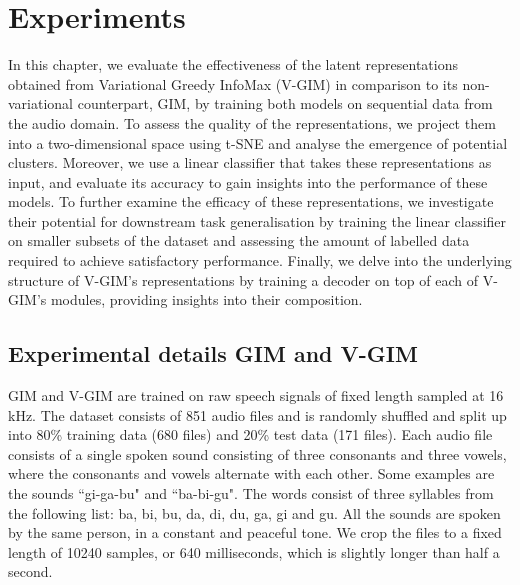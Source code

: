 \chapter{Experiments} \label{cha:4}

In this chapter, we evaluate the effectiveness of the latent representations obtained from Variational Greedy InfoMax (V-GIM) in comparison to its non-variational counterpart, GIM, by training both models on sequential data from the audio domain. To assess the quality of the representations, we project them into a two-dimensional space using t-SNE and analyse the emergence of potential clusters. Moreover, we use a linear classifier that takes these representations as input, and evaluate its accuracy to gain insights into the performance of these models. To further examine the efficacy of these representations, we investigate their potential for downstream task generalisation by training the linear classifier on smaller subsets of the dataset and assessing the amount of labelled data required to achieve satisfactory performance. Finally, we delve into the underlying structure of V-GIM's representations by training a decoder on top of each of V-GIM's modules, providing insights into their composition.


%	

	







\section{Experimental details GIM and V-GIM} \label{cha:experim_details_vgim}
		GIM and V-GIM are trained on raw speech signals of fixed length sampled at 16 kHz. The dataset consists of 851  audio files and is randomly shuffled and split up into 80\% training data (680 files) and 20\% test data (171 files). Each audio file consists of a single spoken sound consisting of three consonants and three vowels, where the consonants and vowels alternate with each other. Some examples are the sounds ``gi-ga-bu" and ``ba-bi-gu". The words consist of three syllables from the following list: ba, bi, bu, da, di, du, ga, gi and gu. All the sounds are spoken by the same person, in a constant and peaceful tone. We crop the files to a fixed length of 10240 samples, or 640 milliseconds, which is slightly longer than half a second.
		
